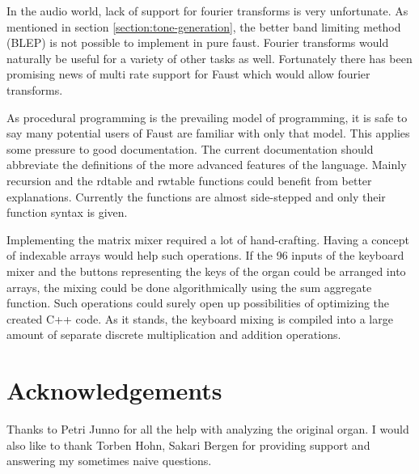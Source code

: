 \documentclass[11pt,a4paper]{article}
\begin{document}
In the audio world, lack of support for fourier transforms is very unfortunate. As mentioned in section \ref{section:tone-generation}, the better band limiting method (BLEP) is not possible to implement in pure faust. Fourier transforms would naturally be useful for a variety of other tasks as well. Fortunately there has been promising news of multi rate support for Faust which would allow fourier transforms.

As procedural programming is the prevailing model of programming, it is safe to say many potential users of Faust are familiar with only that model. This applies some pressure to good documentation. The current documentation should abbreviate the definitions of the more advanced features of the language. Mainly recursion and the rdtable and rwtable functions could benefit from better explanations. Currently the functions are almost side-stepped and only their function syntax is given.

Implementing the matrix mixer required a lot of hand-crafting. Having a concept of indexable arrays would help such operations. If the 96 inputs of the keyboard mixer and the buttons representing the keys of the organ could be arranged into arrays, the mixing could be done algorithmically using the sum aggregate function. Such operations could surely open up possibilities of optimizing the created C++ code. As it stands, the keyboard mixing is compiled into a large amount of separate discrete multiplication and addition operations.



\section{Acknowledgements}

Thanks to Petri Junno for all the help with analyzing the original organ. I would also like to thank Torben Hohn, Sakari Bergen for providing support and answering my sometimes naive questions. %




\end{document}
